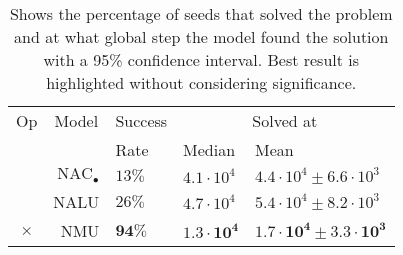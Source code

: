 \begin{table}[!h]

\caption{\label{tab:very-simple-function-results}Shows the percentage of seeds that solved the problem and at what global step the model found the solution with a 95\% confidence interval. Best result is highlighted without considering significance.}
\centering
\begin{tabular}{crlll}
\toprule
\multicolumn{1}{c}{Op} & \multicolumn{1}{c}{Model} & \multicolumn{1}{c}{Success} & \multicolumn{2}{c}{Solved at} \\
\cmidrule(l{3pt}r{3pt}){1-1} \cmidrule(l{3pt}r{3pt}){2-2} \cmidrule(l{3pt}r{3pt}){3-3} \cmidrule(l{3pt}r{3pt}){4-5}
 &  & Rate & Median & Mean\\
\midrule
 & ${\mathrm{NAC}_\bullet}$ & $13\%$ & $4.1 \cdot 10^{4}$ & $4.4 \cdot 10^{4} \pm 6.6 \cdot 10^{3}$\\

 & NALU & $26\%$ & $4.7 \cdot 10^{4}$ & $5.4 \cdot 10^{4} \pm 8.2 \cdot 10^{3}$\\

\multirow{-3}{*}{\centering\arraybackslash $\bm{\times}$} & NMU & $\mathbf{94\%}$ & $\mathbf{1.3 \cdot 10^{4}}$ & $\mathbf{1.7 \cdot 10^{4} \pm 3.3 \cdot 10^{3}}$\\
\bottomrule
\end{tabular}
\end{table}
